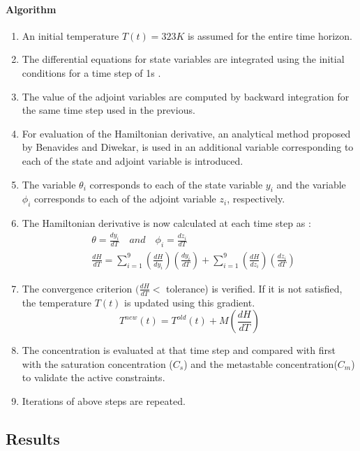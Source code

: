 \paragraph{Algorithm}
\begin{enumerate}
\item An initial temperature $T(t) = 323 K$ is assumed for the entire time horizon.
\item The differential equations for state variables are integrated using the initial conditions for a time step of 1s .
\item The value of the adjoint variables are computed by backward integration for the same time step used in the previous.
\item For evaluation of the Hamiltonian derivative, an analytical method proposed by Benavides and Diwekar\cite{benavides},  is used in an additional variable corresponding to each of the state and adjoint variable is introduced.
\item The variable $\theta_{i}$ corresponds to each of the state variable $y_{i}$ and the variable $\phi_{i}$ corresponds to each of the adjoint variable $z_{i}$, respectively.
\item The Hamiltonian derivative is now calculated at each time step  as :
\begin{align}
&\theta = \frac{dy_{i}}{dT} \quad and \quad \phi_{i} = \frac{dz_{i}}{dT} \\
&\frac{dH}{dT} = \sum_{i=1}^{9} \left( \frac{dH}{dy_{i}}\right)\left(	\frac{dy_{i}}{dT} \right) + \sum_{i=1}^{9} \left(\frac{dH}{dz_{i}}\right)\left(\frac{dz_{i}}{dT} \right)
\end{align}
\item The  convergence criterion $(\frac{dH}{dT}<$ tolerance) is verified. If it is not satisfied, the temperature $T(t)$ is updated using this gradient\cite{yenkie}.
\begin{equation}
T^{new}(t) = T^{old}(t) + M\left(\frac{dH}{dT} \right)
\end{equation}
\item The concentration is evaluated  at that time step and compared with first with the saturation concentration ($C_{s}$) and the metastable concentration($C_{m}$) to validate the active constraints.
\item Iterations of above steps are repeated.
\end{enumerate}


\subsection{Results}

